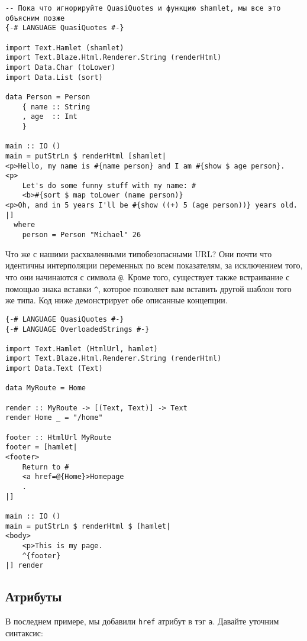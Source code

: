 \begin{lstlisting}
-- Пока что игнорируйте QuasiQuotes и функцию shamlet, мы все это объясним позже
{-# LANGUAGE QuasiQuotes #-}

import Text.Hamlet (shamlet)
import Text.Blaze.Html.Renderer.String (renderHtml)
import Data.Char (toLower)
import Data.List (sort)

data Person = Person
    { name :: String
    , age  :: Int
    }

main :: IO ()
main = putStrLn $ renderHtml [shamlet|
<p>Hello, my name is #{name person} and I am #{show $ age person}.
<p>
    Let's do some funny stuff with my name: #
    <b>#{sort $ map toLower (name person)}
<p>Oh, and in 5 years I'll be #{show ((+) 5 (age person))} years old.
|]
  where
    person = Person "Michael" 26
\end{lstlisting}

Что же с нашими расхваленными типобезопасными URL? Они почти что идентичны
интерполяции переменных по всем показателям, за исключением того, что они
начинаются с символа \texttt{@}. Кроме того, существует также встраивание с помощью
знака вставки \texttt{^}, которое позволяет вам вставить другой шаблон того же типа.
Код ниже демонстрирует обе описанные концепции.

\begin{lstlisting}
{-# LANGUAGE QuasiQuotes #-}
{-# LANGUAGE OverloadedStrings #-}

import Text.Hamlet (HtmlUrl, hamlet)
import Text.Blaze.Html.Renderer.String (renderHtml)
import Data.Text (Text)

data MyRoute = Home

render :: MyRoute -> [(Text, Text)] -> Text
render Home _ = "/home"

footer :: HtmlUrl MyRoute
footer = [hamlet|
<footer>
    Return to #
    <a href=@{Home}>Homepage
    .
|]

main :: IO ()
main = putStrLn $ renderHtml $ [hamlet|
<body>
    <p>This is my page.
    ^{footer}
|] render
\end{lstlisting}

\subsection{Атрибуты}
В последнем примере, мы добавили \texttt{href} атрибут в тэг \texttt{a}. Давайте
уточним синтаксис:

